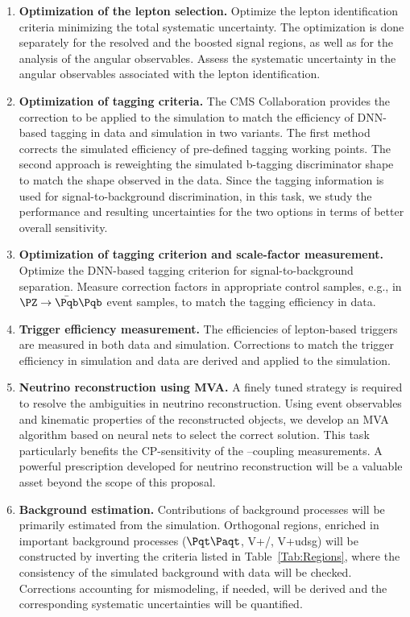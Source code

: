 \documentclass[a4paper,11pt]{article}
\newcommand{\Pb}{{{\Pqb}}\xspace}
\newcommand{\Pt}{{{\Pqt}}\xspace}
\newcommand{\Pc}{{{\Pqc}}\xspace}
\newcommand{\PAt}{{{{\Paqt}}}\xspace}
\renewcommand{\PV}{{{{V}}}\xspace}
\begin{document}
\begin{enumerate}[noitemsep,topsep=0pt]
\item {\bf Optimization of the lepton selection.} Optimize the lepton identification criteria minimizing the total systematic uncertainty. The optimization is done separately for the resolved and the boosted signal regions, as well as for the analysis of the angular observables.
Assess the systematic uncertainty in the angular observables associated with the lepton identification.

\item {\bf Optimization of \Pb tagging criteria.} 
The CMS Collaboration provides the correction to be applied to the simulation to match the efficiency of DNN-based \Pb tagging in data and simulation in two variants. 
The first method corrects the simulated efficiency of pre-defined  \Pb tagging working points. 
The second approach is reweighting the simulated b-tagging discriminator shape to match the shape observed in the data.
Since the \Pb tagging information is used for signal-to-background discrimination, in this task, we study the performance and resulting uncertainties for the two options in terms of better overall sensitivity.

\item {\bf Optimization of \PH tagging criterion and scale-factor measurement.} Optimize the DNN-based \PH tagging criterion for signal-to-background separation. 
Measure correction factors in appropriate control samples, e.g., in $\PZ\rightarrow\bar \Pqb\Pqb$ event samples, to match the tagging efficiency in data.

\item {\bf Trigger efficiency measurement.} The efficiencies of lepton-based triggers are measured in both data and simulation. 
Corrections to match the trigger efficiency in simulation and data are derived and applied to the simulation. 

\item {\bf Neutrino reconstruction using MVA.}
A finely tuned strategy is required to resolve the ambiguities in neutrino reconstruction. 
Using event observables and kinematic properties of the reconstructed objects, we develop an MVA algorithm based on neural nets to select the correct solution. 
This task particularly benefits the CP-sensitivity of the \PH--\PW coupling measurements. 
A powerful prescription developed for neutrino reconstruction will be a valuable asset beyond the scope of this proposal.

\item {\bf Background estimation.} 
Contributions of background processes will be primarily estimated from the simulation. Orthogonal regions, enriched in important background processes ($\Pt\PAt$, {\PV}+\Pb/\Pc, {\PV}+udsg) will be constructed by inverting the criteria listed in Table~\ref{Tab:Regions}, where the consistency of the simulated background with data will be checked. 
Corrections accounting for mismodeling, if needed, will be derived and the corresponding systematic uncertainties will be quantified. 


\end{enumerate}
\end{document}
